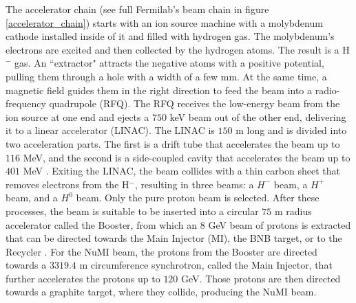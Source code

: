 The accelerator chain (see full Fermilab's beam chain in figure \ref{accelerator_chain}) starts with an ion source machine with a molybdenum cathode installed inside of it and filled with hydrogen gas. The molybdenum's electrons are excited and then collected by the hydrogen atoms. The result is a H$^-$ gas. An ``extractor" attracts the negative atoms with a positive potential, pulling them through a hole with a width of a few mm. At the same time, a magnetic field guides them in the right direction to feed the beam into a radio-frequency quadrupole (RFQ). The RFQ receives the low-energy beam from the ion source at one end and ejects a $750$ keV \cite{RFQ_website} beam out of the other end, delivering it to a linear accelerator (LINAC). The LINAC is $150$ m long and is divided into two acceleration parts. The first is a drift tube that accelerates the beam up to $116$ MeV, and the second is a side-coupled cavity that accelerates the beam up to $401$ MeV \cite{LINAC_website}. Exiting the LINAC, the beam collides with a thin carbon sheet that removes electrons from the H$^-$, resulting in three beams: a $H^-$ beam, a $H^+$ beam, and a $H^0$ beam. Only the pure proton beam is selected. After these processes, the beam is suitable to be inserted into a circular $75$ m radius accelerator called the Booster, from which an $8$ GeV beam of protons is extracted that can be directed towards the Main Injector (MI), the BNB target, or to the Recycler \cite{booster_website}. For the NuMI beam, the protons from the Booster are directed towards a $3319.4$ m circumference synchrotron, called the Main Injector, that further accelerates the protons up to $120$ GeV. Those protons are then directed towards a graphite target, where they collide, producing the NuMI beam.
  
